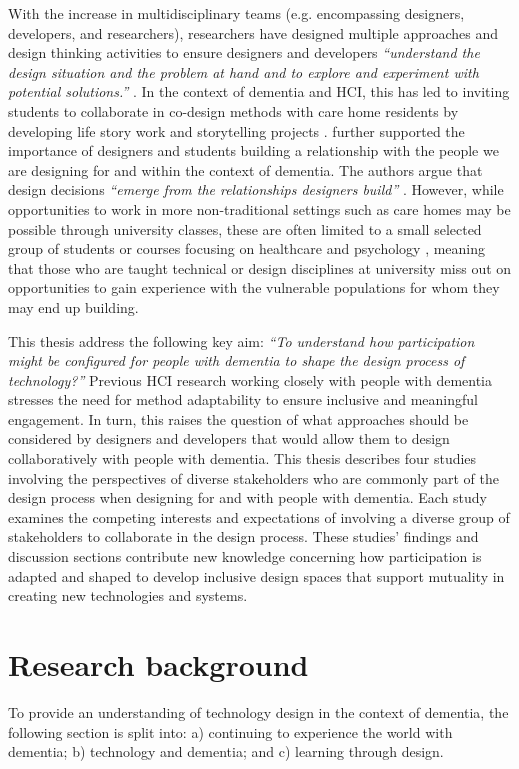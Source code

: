 With the increase in multidisciplinary teams (e.g. encompassing designers, developers, and researchers), researchers have designed multiple approaches and design thinking activities to ensure designers and developers  \textit{``understand the design situation and the problem at hand and to explore and experiment with potential solutions.''} \citep[p.21]{dalsgaard2017instruments}. In the context of dementia and HCI, this has led to inviting students to collaborate in co-design methods with care home residents by developing life story work \citep{foley_student_2020} and storytelling projects \citep{hannan_zeitgeist_2019}. \cite{hendriks_valuing_2018} further supported the importance of designers and students building a relationship with the people we are designing for and within the context of dementia. The authors argue that design decisions \textit{``emerge from the relationships designers build''} \citep[pg. 3]{hendriks_valuing_2018}. However, while opportunities to work in more non-traditional settings such as care homes may be possible through university classes, these are often limited to a small selected group of students or courses focusing on healthcare and psychology \citep{kinnunen_understanding_2018}, meaning that those who are taught technical or design disciplines at university miss out on opportunities to gain experience with the vulnerable populations for whom they may end up building.

This thesis address the following key aim: \textit{``To understand how participation might be configured for people with dementia to shape the design process of technology?''} Previous HCI research working closely with people with dementia stresses the need for method adaptability to ensure inclusive and meaningful engagement. In turn, this raises the question of what approaches should be considered by designers and developers that would allow them to design collaboratively with people with dementia. This thesis describes four studies involving the perspectives of diverse stakeholders who are commonly part of the design process when designing for and with people with dementia. Each study examines the competing interests and expectations of involving a diverse group of stakeholders to collaborate in the design process. These studies' findings and discussion sections contribute new knowledge concerning how participation is adapted and shaped to develop inclusive design spaces that support mutuality in creating new technologies and systems.

\section{Research background}
\label{Intro: ResearchContext}
To provide an understanding of technology design in the context of dementia, the following section is split into: a) continuing to experience the world with dementia; b) technology and dementia; and c) learning through design. 

